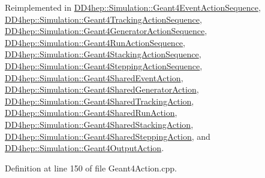Reimplemented in \hyperlink{class_d_d4hep_1_1_simulation_1_1_geant4_event_action_sequence_a552fac0ec8632b417f81453b4d79e0c4}{D\+D4hep\+::\+Simulation\+::\+Geant4\+Event\+Action\+Sequence}, \hyperlink{class_d_d4hep_1_1_simulation_1_1_geant4_tracking_action_sequence_afff6a1aeeb049c8ee0ee2819d54b65d0}{D\+D4hep\+::\+Simulation\+::\+Geant4\+Tracking\+Action\+Sequence}, \hyperlink{class_d_d4hep_1_1_simulation_1_1_geant4_generator_action_sequence_a0ba4324a4f977eb12057e789eaf44f07}{D\+D4hep\+::\+Simulation\+::\+Geant4\+Generator\+Action\+Sequence}, \hyperlink{class_d_d4hep_1_1_simulation_1_1_geant4_run_action_sequence_adf657c521620857ffed702783c0a2712}{D\+D4hep\+::\+Simulation\+::\+Geant4\+Run\+Action\+Sequence}, \hyperlink{class_d_d4hep_1_1_simulation_1_1_geant4_stacking_action_sequence_af292bcae909cc6b7bc4a94c0f0e07b9c}{D\+D4hep\+::\+Simulation\+::\+Geant4\+Stacking\+Action\+Sequence}, \hyperlink{class_d_d4hep_1_1_simulation_1_1_geant4_stepping_action_sequence_ad5680d2d225421b9cf2cd6b530d3ab5f}{D\+D4hep\+::\+Simulation\+::\+Geant4\+Stepping\+Action\+Sequence}, \hyperlink{class_d_d4hep_1_1_simulation_1_1_geant4_shared_event_action_a7933d545b7caacaca3928b3af1038df6}{D\+D4hep\+::\+Simulation\+::\+Geant4\+Shared\+Event\+Action}, \hyperlink{class_d_d4hep_1_1_simulation_1_1_geant4_shared_generator_action_a9ca0ac287c96f37ceaa07740c43e7457}{D\+D4hep\+::\+Simulation\+::\+Geant4\+Shared\+Generator\+Action}, \hyperlink{class_d_d4hep_1_1_simulation_1_1_geant4_shared_tracking_action_a7033aa446a1fbce97cf260caaf55b5b2}{D\+D4hep\+::\+Simulation\+::\+Geant4\+Shared\+Tracking\+Action}, \hyperlink{class_d_d4hep_1_1_simulation_1_1_geant4_shared_run_action_a6077a3ce7deb655ef76d4fe4e8dc1b19}{D\+D4hep\+::\+Simulation\+::\+Geant4\+Shared\+Run\+Action}, \hyperlink{class_d_d4hep_1_1_simulation_1_1_geant4_shared_stacking_action_af204c8b8ed06b5ac14c168ea639c51ac}{D\+D4hep\+::\+Simulation\+::\+Geant4\+Shared\+Stacking\+Action}, \hyperlink{class_d_d4hep_1_1_simulation_1_1_geant4_shared_stepping_action_ae023874861eb3048eba53ef6cd253224}{D\+D4hep\+::\+Simulation\+::\+Geant4\+Shared\+Stepping\+Action}, and \hyperlink{class_d_d4hep_1_1_simulation_1_1_geant4_output_action_abc1171027ea0a21fedef2d49a14ec557}{D\+D4hep\+::\+Simulation\+::\+Geant4\+Output\+Action}.



Definition at line 150 of file Geant4\+Action.\+cpp.



